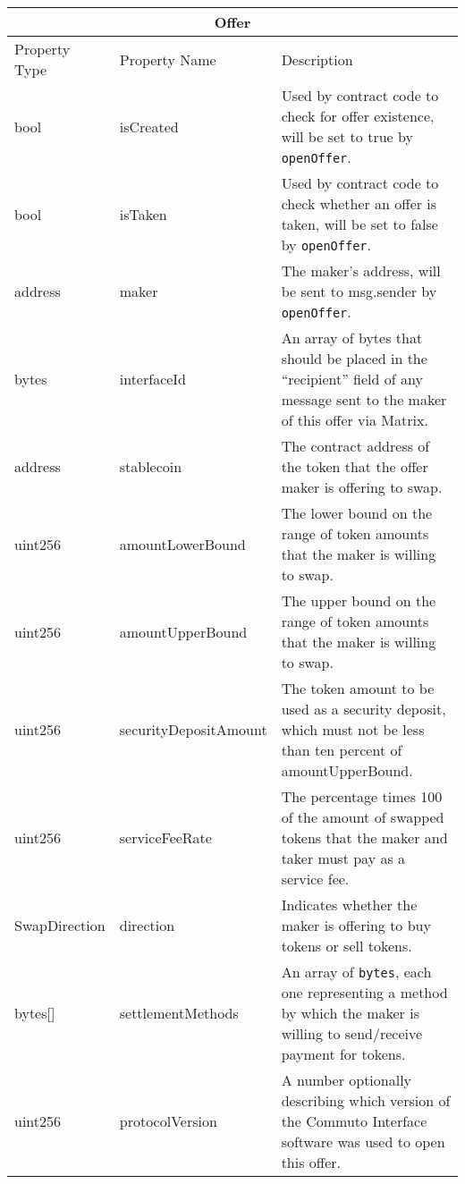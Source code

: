 \documentclass[11pt]{article}
\begin{document}
    \begin{longtable}[p]{ |p{2.5cm}|p{4cm}|p{7cm}| }
    \hline
    \multicolumn{3}{|c|}{Offer} \\
    \hline
    Property Type & Property Name & Description \\
    \hline
    bool & isCreated & Used by contract code to check for offer existence, will be set to true
    by \verb|openOffer|. \\
    bool & isTaken & Used by contract code to check whether an offer is taken, will be set to
    false by \verb|openOffer|. \\
    address & maker & The maker's address, will be sent to msg.sender by \verb|openOffer|. \\
    bytes & interfaceId & An array of bytes that should be placed in the ``recipient'' field of any
    message sent to the maker of this offer via Matrix. \\
    address & stablecoin & The contract address of the token that the offer maker is offering to
    swap. \\
    uint256 & amountLowerBound & The lower bound on the range of token amounts that the maker is
    willing to swap. \\
    uint256 & amountUpperBound & The upper bound on the range of token amounts that the maker is
    willing to swap. \\
    uint256 & securityDepositAmount & The token amount to be used as a security deposit, which must
    not be less than ten percent of amountUpperBound. \\
    uint256 & serviceFeeRate & The percentage times 100 of the amount of swapped tokens that the
    maker and taker must pay as a service fee. \\
    SwapDirection & direction & Indicates whether the maker is offering to buy tokens or sell
    tokens. \\
    bytes[] & settlementMethods & An array of \verb|bytes|, each one representing a method by which
    the maker is willing to send/receive payment for tokens. \\
    uint256 & protocolVersion & A number optionally describing which version of the Commuto
    Interface software was used to open this offer. \\
        \hline
    \end{longtable}
\end{document}
